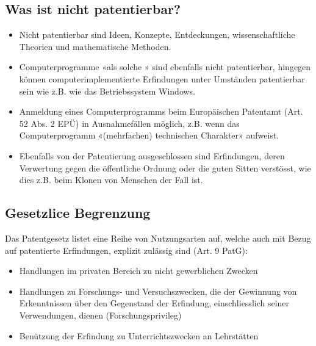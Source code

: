\subsection{Was ist nicht patentierbar?}

\begin{itemize}
	\tightlist
	\item Nicht patentierbar sind Ideen, Konzepte, Entdeckungen,
	wissenschaftliche Theorien und mathematische Methoden.
	\item Computerprogramme «als solche » sind ebenfalls nicht patentierbar,
	hingegen können computerimplementierte Erfindungen unter Umständen
	patentierbar sein wie z.B. wie das Betriebssystem Windows.
	\item Anmeldung eines Computerprogramms beim Europäischen Patentamt (Art. 52
	Abs. 2 EPÜ) in Ausnahmefällen möglich, z.B. wenn das Computerprogramm
	«(mehrfachen) technischen Charakter» aufweist.
	\item Ebenfalls von der Patentierung ausgeschlossen sind Erfindungen, deren
	Verwertung gegen die öffentliche Ordnung oder die guten Sitten
	verstösst, wie dies z.B. beim Klonen von Menschen der Fall ist.
\end{itemize}


\subsection{Gesetzlice Begrenzung}
\label{sec:Patentrecht-Begrenzug}

Das Patentgesetz listet eine Reihe von Nutzungsarten auf, welche auch
mit Bezug auf patentierte Erfindungen, explizit zulässig sind (Art. 9
PatG):
\begin{itemize}
	\tightlist
	\item Handlungen im privaten Bereich zu nicht gewerblichen Zwecken
	\item Handlungen zu Forschungs- und Versuchszwecken, die der Gewinnung von
	Erkenntnissen über den Gegenstand der Erfindung, einschliesslich seiner
	Verwendungen, dienen (Forschungsprivileg)
	\item Benützung der Erfindung zu
	Unterrichtszwecken an Lehrstätten
\end{itemize}

